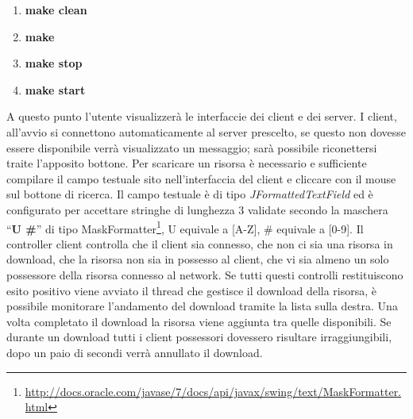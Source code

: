 \documentclass[
10pt, %
a4paper, %
oneside, %
BCOR5mm, %
]{scrartcl}
\begin{document}
		\begin{enumerate}
			\item  \textbf{make clean}
			\item  \textbf{make}
			\item  \textbf{make stop}
			\item  \textbf{make start}
		\end{enumerate}

	A questo punto l'utente visualizzerà le interfaccie dei client e dei server. I client, all'avvio si connettono automaticamente al server prescelto, se questo non dovesse essere disponibile verrà visualizzato un messaggio; sarà possibile riconettersi traite l'apposito bottone.
	Per scaricare un risorsa è necessario e sufficiente compilare il campo testuale sito nell'interfaccia del client e cliccare con il mouse sul bottone di ricerca. Il campo testuale è di tipo \emph{JFormattedTextField} ed è configurato per accettare stringhe di lunghezza 3 validate secondo la maschera ``\textbf{U \#}''  di tipo  MaskFormatter\footnote{\href{http://docs.oracle.com/javase/7/docs/api/javax/swing/text/MaskFormatter.html}{http://docs.oracle.com/javase/7/docs/api/javax/swing/text/MaskFormatter.html}}, U equivale a [A-Z], \# equivale a [0-9].
	Il controller client controlla che il client sia connesso, che non ci sia una risorsa in download, che la risorsa non sia in possesso al client, che vi sia almeno un solo possessore della risorsa connesso al network. Se tutti questi controlli restituiscono esito positivo viene avviato il thread che gestisce il download della risorsa, è possibile monitorare l'andamento del download tramite la lista sulla destra. Una volta completato il download la risorsa viene aggiunta tra quelle disponibili. Se durante un download tutti i client possessori dovessero risultare irraggiungibili, dopo un paio di secondi verrà annullato il download.
\end{document}
